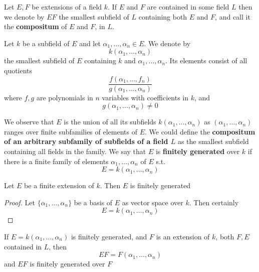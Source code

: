 \documentclass[11pt]{article}
\begin{document}
Let \(E,F\) be extensions of a field \(k\). If \(E\) and \(F\) are contained in some field \(L\)
then we denote by \(EF\) the smallest subfield of \(L\) containing both \(E\) and \(F\), and call
it the \textbf{compositum} of \(E\) and \(F\), in \(L\).

Let \(k\) be a subfield of \(E\) and let \(\alpha_1,\dots,\alpha_n\in E\). We denote by
\begin{equation*}
k(\alpha_1,\dots,\alpha_n)
\end{equation*}
the smallest subfield of \(E\) containing \(k\) and \(\alpha_1,\dots,\alpha_n\). Its elements consist of all
quotients
\begin{equation*}
\frac{f(\alpha_1,\dots,f_n)}{g(\alpha_1,\dots,\alpha_n)}
\end{equation*}
where \(f,g\) are polynomials in \(n\) variables with coefficients in \(k\), and
\begin{equation*}
g(\alpha_1,\dots,\alpha_n)\neq 0
\end{equation*}

We observe that \(E\) is the union of all its subfields \(k(\alpha_1,\dots,\alpha_n)\) as \((\alpha_1,\dots,\alpha_n)\) ranges
over finite subfamilies of elements of \(E\). We could define the \textbf{compositum of an arbitrary}
\textbf{subfamily of subfields of a field \(L\)} as the smallest subfield containing all fields in the
family. We say that \(E\) is \textbf{finitely generated} over \(k\) if there is a finite family of
elements \(\alpha_1,\dots,\alpha_n\) of \(E\) s.t.
\begin{equation*}
E=k(\alpha_1,\dots,\alpha_n)
\end{equation*}

\begin{proposition}[]
Let \(E\) be a finite extension of \(k\). Then \(E\) is finitely generated
\end{proposition}

\begin{proof}
Let \(\{\alpha_1,\dots,\alpha_n\}\) be a basis of \(E\) as vector space over \(k\). Then certainly
\begin{equation*}
E=k(\alpha_1,\dots,\alpha_n)
\end{equation*}
\end{proof}

If \(E=k(\alpha_1,\dots,\alpha_n)\) is finitely generated, and \(F\) is an extension of \(k\), both \(F,E\)
contained in \(L\), then
\begin{equation*}
EF=F(\alpha_1,\dots,\alpha_n)
\end{equation*}
and \(EF\) is finitely generated over \(F\)
\begin{center}\end{center}
\end{document}

